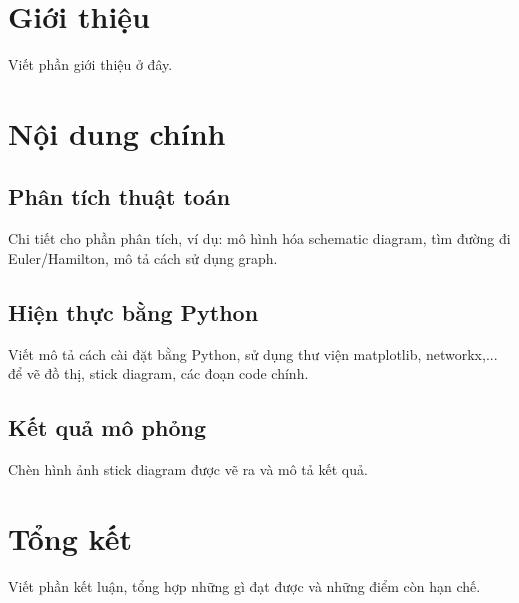 \documentclass[a4paper,12pt]{article}
\begin{document}
\section{Giới thiệu}
Viết phần giới thiệu ở đây.

\section{Nội dung chính}

\subsection{Phân tích thuật toán}
Chi tiết cho phần phân tích, ví dụ: mô hình hóa schematic diagram, tìm đường đi Euler/Hamilton, mô tả cách sử dụng graph.

\subsection{Hiện thực bằng Python}
Viết mô tả cách cài đặt bằng Python, sử dụng thư viện matplotlib, networkx,... để vẽ đồ thị, stick diagram, các đoạn code chính.

\subsection{Kết quả mô phỏng}
Chèn hình ảnh stick diagram được vẽ ra và mô tả kết quả.

\section{Tổng kết}
Viết phần kết luận, tổng hợp những gì đạt được và những điểm còn hạn chế.
\end{document}
